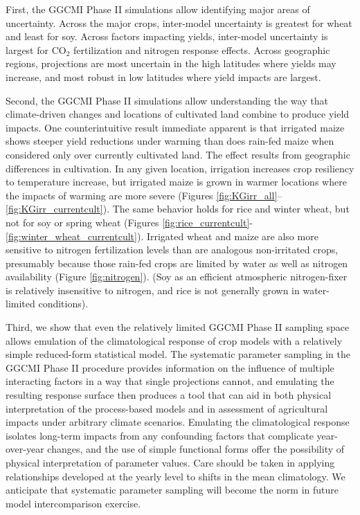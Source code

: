 \documentclass[preprint, 5p, times, twocolumn]{elsarticle}
\begin{document}
First, the GGCMI Phase II simulations allow identifying major areas of uncertainty. Across the major crops, inter-model uncertainty is greatest for wheat and least for soy. Across factors impacting yields, inter-model uncertainty is largest for CO$_2$ fertilization and nitrogen response effects. Across geographic regions, projections are most uncertain in the high latitudes where yields may increase, and most robust in low latitudes where yield impacts are largest.  

Second, the GGCMI Phase II simulations allow understanding the way that climate-driven changes and locations of cultivated land combine to produce yield impacts. One counterintuitive result immediate apparent is that irrigated maize shows steeper yield reductions under warming than does rain-fed maize when considered only over currently cultivated land. The effect results from geographic differences in cultivation. In any given location, irrigation increases crop resiliency to temperature increase, but irrigated maize is grown in warmer locations where the impacts of warming are more severe (Figures \ref{fig:KGirr_all}--\ref{fig:KGirr_currentcult}). The same behavior holds for rice and winter wheat, but not for soy or spring wheat (Figures \ref{fig:rice_currentcult}-\ref{fig:winter_wheat_currentcult}). Irrigated wheat and maize are also more sensitive to nitrogen fertilization levels than are analogous non-irritated crops, presumably because those rain-fed crops are limited by water as well as nitrogen availability (Figure \ref{fig:nitrogen}). (Soy as an efficient atmospheric nitrogen-fixer is relatively insensitive to nitrogen, and rice is not generally grown in water-limited conditions).

Third, we show that even the relatively limited GGCMI Phase II sampling space allows emulation of the climatological response of crop models with a relatively simple reduced-form statistical model. The systematic parameter sampling in the GGCMI Phase II procedure provides information on the influence of multiple interacting factors in a way that single projections cannot, and emulating the resulting response surface then produces a tool that can aid in both physical interpretation of the process-based models and in assessment of agricultural impacts under arbitrary climate scenarios. Emulating the climatological response isolates long-term impacts from any confounding factors that complicate year-over-year changes, and the use of simple functional forms offer the possibility of physical interpretation of parameter values. Care should be taken in applying relationships developed at the yearly level to shifts in the mean climatology. We anticipate that systematic parameter sampling will become the norm in future model intercomparison exercise.
\end{document}
